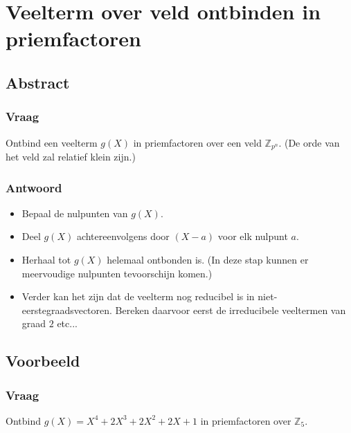 \documentclass[main.tex]{subfiles}
\begin{document}
\newpage
\section{Veelterm over veld ontbinden in priemfactoren}

\subsection*{Abstract}
\subsubsection*{Vraag}
Ontbind een veelterm $g(X)$ in priemfactoren over een veld $\mathbb{Z}_{p^{n}}$.
(De orde van het veld zal relatief klein zijn.)
\subsubsection*{Antwoord}
\begin{itemize}
\item Bepaal de nulpunten van $g(X)$.
\item Deel $g(X)$ achtereenvolgens door $(X-a)$ voor elk nulpunt $a$.
\item Herhaal tot $g(X)$ helemaal ontbonden is. (In deze stap kunnen er meervoudige nulpunten tevoorschijn komen.)
\item Verder kan het zijn dat de veelterm nog reducibel is in niet-eerstegraadsvectoren.
Bereken daarvoor eerst de irreducibele veeltermen van graad $2$ etc...
\end{itemize}
\subsection*{Voorbeeld}
\subsubsection*{Vraag}
Ontbind $g(X) = X^{4} + 2X^{3} + 2X^{2} + 2X + 1$ in priemfactoren over $\mathbb{Z}_{5}$.
\end{document}

